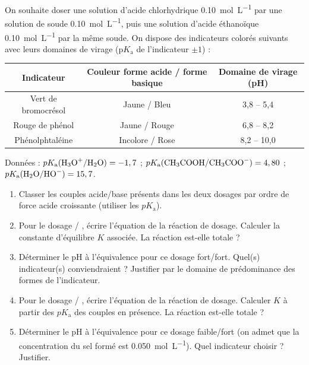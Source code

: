 \documentclass[11pt]{article}
\begin{document}
\begin{exercice}
On souhaite doser une solution d'acide chlorhydrique  \SI{0.10}{mol L^{-1}} par une solution de soude  \SI{0.10}{mol L^{-1}}, puis une solution d'acide éthanoïque  \SI{0.10}{mol L^{-1}} par la même soude. On dispose des indicateurs colorés suivants avec leurs domaines de virage (p$K_{\text{a}}$ de l'indicateur $\pm 1$) :
\begin{center}
\begin{tabular}{|c|c|c|}
\hline
Indicateur & Couleur forme acide / forme basique & Domaine de virage (pH) \\ \hline
Vert de bromocrésol & Jaune / Bleu & 3,8 -- 5,4 \\ \hline
Rouge de phénol & Jaune / Rouge & 6,8 -- 8,2 \\ \hline
Phénolphtaléine & Incolore / Rose & 8,2 -- 10,0 \\ \hline
\end{tabular}
\end{center}
Données : $pK_{\text{a}}(\ce{H3O+/H2O}) = -1,7$ ; $pK_{\text{a}}(\ce{CH3COOH/CH3COO-}) = 4,80$ ; $pK_{\text{a}}(\ce{H2O/HO-}) = 15,7$.
\begin{enumerate}
    \item Classer les couples acide/base présents dans les deux dosages par ordre de force acide croissante (utiliser les $pK_{\text{a}}$).
    \item Pour le dosage  / , écrire l'équation de la réaction de dosage. Calculer la constante d'équilibre $K$ associée. La réaction est-elle totale ?
    \item Déterminer le pH à l'équivalence pour ce dosage fort/fort. Quel(s) indicateur(s) conviendraient ? Justifier par le domaine de prédominance des formes de l'indicateur.
    \item Pour le dosage  / , écrire l'équation de la réaction de dosage. Calculer $K$ à partir des $pK_{\text{a}}$ des couples en présence. La réaction est-elle totale ?
    \item Déterminer le pH à l'équivalence pour ce dosage faible/fort (on admet que la concentration du sel formé est \SI{0.050}{mol L^{-1}}). Quel indicateur choisir ? Justifier.
\end{enumerate}
\end{exercice}
\end{document}
